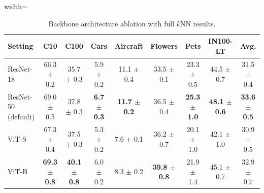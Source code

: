 \begin{table}[H]
\centering
\scriptsize
\setlength{\tabcolsep}{3.5pt}
\caption{Backbone architecture ablation with full $k$NN results.}
\label{tab:app_architecture_knn}
\begin{adjustbox}{width=\textwidth}
\begin{tabular}{l c c c c c c c c}
\toprule
Setting & C10 & C100 & Cars & Aircraft & Flowers & Pets & IN100-LT & Avg. \\
\midrule
ResNet-18 & 66.3 {\scriptsize$\pm$ 0.2} & 35.7 {\scriptsize$\pm$ 0.3} & 5.9 {\scriptsize$\pm$ 0.2} & 11.1 {\scriptsize$\pm$ 0.4} & 33.5 {\scriptsize$\pm$ 0.1} & 23.3 {\scriptsize$\pm$ 0.5} & 44.5 {\scriptsize$\pm$ 0.7} & 31.5 {\scriptsize$\pm$ 0.4} \\
ResNet-50 (default) & 69.0 {\scriptsize$\pm$ 0.5} & 37.8 {\scriptsize$\pm$ 0.3} & \textbf{6.7 {\scriptsize$\pm$ 0.3}} & \textbf{11.7 {\scriptsize$\pm$ 0.2}} & 36.5 {\scriptsize$\pm$ 0.4} & \textbf{25.3 {\scriptsize$\pm$ 1.0}} & \textbf{48.1 {\scriptsize$\pm$ 0.6}} & \textbf{33.6 {\scriptsize$\pm$ 0.5}} \\
ViT-S & 67.3 {\scriptsize$\pm$ 0.4} & 37.5 {\scriptsize$\pm$ 0.3} & 5.3 {\scriptsize$\pm$ 0.2} & 7.6 {\scriptsize$\pm$ 0.1} & 36.2 {\scriptsize$\pm$ 0.7} & 20.1 {\scriptsize$\pm$ 1.0} & 42.1 {\scriptsize$\pm$ 1.0} & 30.9 {\scriptsize$\pm$ 0.5} \\
ViT-B & \textbf{69.3 {\scriptsize$\pm$ 0.8}} & \textbf{40.1 {\scriptsize$\pm$ 0.8}} & 6.0 {\scriptsize$\pm$ 0.2} & 8.3 {\scriptsize$\pm$ 0.2} & \textbf{39.8 {\scriptsize$\pm$ 0.8}} & 21.9 {\scriptsize$\pm$ 1.4} & 45.1 {\scriptsize$\pm$ 0.7} & 32.9 {\scriptsize$\pm$ 0.7} \\
\bottomrule
\end{tabular}
\end{adjustbox}
\end{table}
